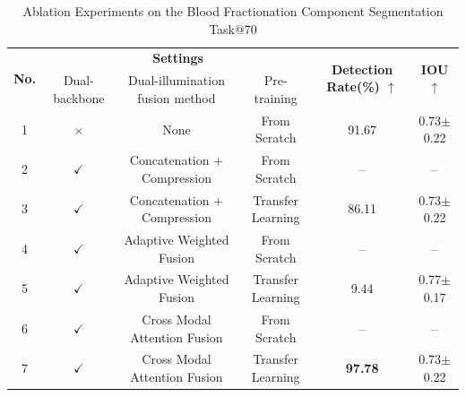 \documentclass[journal,twoside,web]{ieeecolor}
\begin{document}
\begin{table}[!t]
\caption{Ablation Experiments on the Blood Fractionation Component Segmentation Task@70}
\label{table3}
\centering
\setlength{\tabcolsep}{12pt}
\renewcommand{\arraystretch}{1.8}
\begin{tabular}{c c c c c c}
\hline
\multirow{2}{*}{\textbf{No.}} &
\multicolumn{3}{c}{\textbf{Settings}} &
\multirow{2}{*}{\textbf{Detection Rate(\%) $\uparrow$}} &
\multirow{2}{*}{\textbf{IOU $\uparrow$}} \\
\cline{2-4}
 & Dual-backbone & Dual-illumination fusion method & Pre-training & \\
\hline
1 & $\times$     & None                         & From Scratch      & 91.67 & 0.73$\pm$0.22 \\
2 & $\checkmark$ & Concatenation + Compression  & From Scratch      & --    & -- \\
3 & $\checkmark$ & Concatenation + Compression  & Transfer Learning & 86.11 & 0.73$\pm$0.22 \\
4 & $\checkmark$ & Adaptive Weighted Fusion     & From Scratch      & --    & -- \\
5 & $\checkmark$ & Adaptive Weighted Fusion     & Transfer Learning & 9.44  & 0.77$\pm$0.17 \\
6 & $\checkmark$ & Cross Modal Attention Fusion & From Scratch      & --    & -- \\
7 & $\checkmark$ & Cross Modal Attention Fusion & Transfer Learning & \textbf{97.78} & 0.73$\pm$0.22 \\
\hline
\end{tabular}
\end{table}
\end{document}
